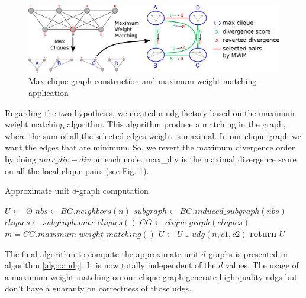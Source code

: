 \begin{figure}[htp]
    \centering
    \includegraphics[width=\textwidth]{mwm.pdf}
    \caption{Max clique graph construction and maximum weight matching application}
    \label{fig:mwm}
\end{figure}

Regarding the two hypothesis, we created a udg factory based on the maximum weight matching algorithm.
This algorithm produce a matching in the graph, where the sum of all the selected edges weight is maximal.
In our clique graph we want the edges that are minimum.
So, we revert the maximum divergence order by doing $max\_div - div$ on each node. max\_div is the maximal divergence score on all the local clique pairs (see Fig. \ref{fig:mwm}).

\begin{algorithm}
    \caption{Approximate unit $d$-graph computation}
    \label{algo:audg}
    \begin{algorithmic}[1] %
         
            \State $U \gets$ \O
            \State $nbs\gets BG.neighbors(n)$
            \State $subgraph \gets BG.induced\_subgraph(nbs)$
            \State $cliques \gets subgraph.max\_cliques()$ 
            \State $CG \gets clique\_graph(cliques)$ 
            \State $m = CG.maximum\_weight\_matching()$
                \State $U \gets U \cup udg(n, c1, c2)$ 
            \EndFor
            \State \textbf{return} $U$
        \EndProcedure
    \end{algorithmic}
\end{algorithm}

The final algorithm to compute the approximate unit $d$-graphs is presented in algorithm \ref{algo:audg}.
It is now totally independent of the $d$ values.
The usage of a maximum weight matching on our clique graph generate high quality udgs but don't have a guaranty on correctness of those udgs.

